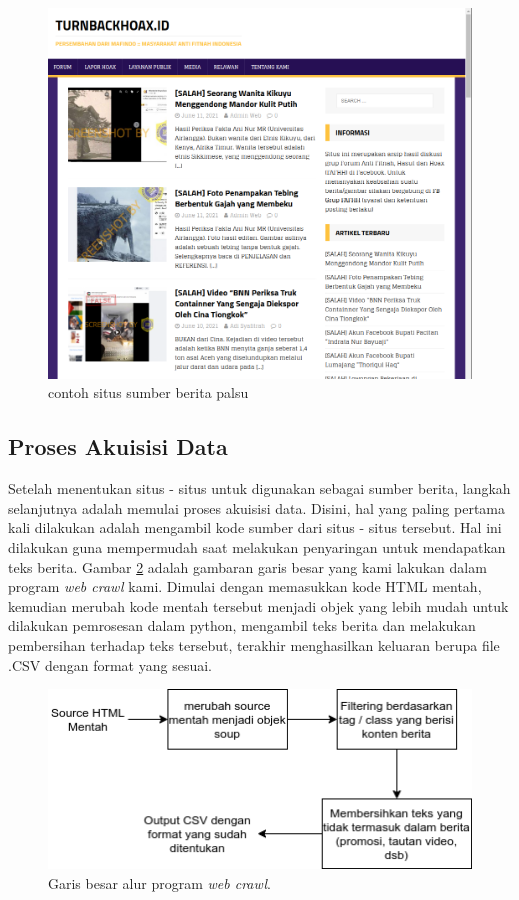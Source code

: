 \begin{figure}[h!]
  \begin{center}
    \includegraphics[width= \linewidth]{gambar/hoax_news.png}
    \caption{contoh situs sumber berita palsu}
    \label{fig: hoax_news_source}
  \end{center}
\end{figure}

\subsection{Proses Akuisisi Data}

Setelah menentukan situs - situs untuk digunakan sebagai sumber berita, langkah selanjutnya adalah memulai proses akuisisi data. Disini, hal yang paling pertama kali dilakukan adalah mengambil kode sumber dari situs - situs tersebut. Hal ini dilakukan guna mempermudah saat melakukan penyaringan untuk mendapatkan teks berita. Gambar \ref{fig:webcrawl_method} adalah gambaran garis besar yang kami lakukan dalam program \textit{web crawl} kami. Dimulai dengan memasukkan kode HTML mentah, kemudian merubah kode mentah tersebut menjadi objek yang lebih mudah untuk dilakukan pemrosesan dalam python, mengambil teks berita dan melakukan pembersihan terhadap teks tersebut, terakhir menghasilkan keluaran berupa file .CSV dengan format yang sesuai.

\begin{figure} [ht]
  \centering
  \includegraphics[width=.9\linewidth]{gambar/webcrawl method_box.png}
  \caption{Garis besar alur program \textit{web crawl}.}
  \label{fig:webcrawl_method}
\end{figure}

